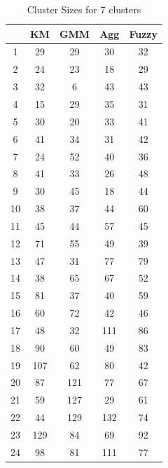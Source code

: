 \documentclass[conference]{IEEEtran}
\begin{document}
\begin{table}[ht]
    \begin{center}
        \caption{Cluster Sizes for 7 clusters}
        \renewcommand{\arraystretch}{1.0}
        \begin{tabular}{ |c|c|c|c|c| } 
            \hline
            & KM & GMM & Agg & Fuzzy \\
            \hline
            1 & 29 & 29 & 30 & 32\\
            \hline
            2 & 24 & 23 & 18 & 29\\ 
            \hline
            3 & 32 & 6 & 43 & 43\\ 
            \hline
            4 & 15 & 29 & 35 & 31\\
            \hline
            5 & 30 & 20 & 33 & 41\\
            \hline
            6 & 41 & 34 & 31 & 42\\
            \hline
            7 & 24 & 52 & 40 & 36\\
            \hline
            8 & 41 & 33 & 26 & 48\\
            \hline
            9 & 30 & 45 & 18 & 44\\ 
            \hline
            10 & 38 & 37 & 44 & 60\\ 
            \hline
            11 & 45 & 44 & 57 & 45\\
            \hline
            12 & 71 & 55 & 49 & 39\\
            \hline
            13 & 47 & 31 & 77 & 79\\
            \hline
            14 & 38 & 65 & 67 & 52\\
            \hline
            15 & 81 & 37 & 40 & 59\\
            \hline
            16 & 60 & 72 & 42 & 46\\ 
            \hline
            17 & 48 & 32 & 111 & 86\\ 
            \hline
            18 & 90 & 60 & 49 & 83\\
            \hline
            19 & 107 & 62 & 80 & 42\\
            \hline
            20 & 87 & 121 & 77 & 67\\
            \hline
            21 & 59 & 127 & 29 & 61\\
            \hline
            22 & 44 & 129 & 132 & 74\\
            \hline
            23 & 129 & 84 & 69 & 92\\
            \hline
            24 & 98 & 81 & 111 & 77\\
            \hline
        \end{tabular}
    \end{center}
\end{table}
\end{document}

